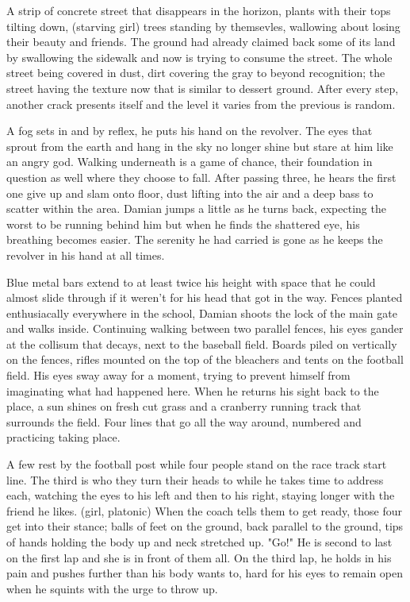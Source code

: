 \begin{Document}
       A strip of concrete street that disappears in the horizon, plants with their tops tilting down, (starving girl) trees standing by themsevles, wallowing
    about losing their beauty and friends. The ground had already claimed back some of its land by swallowing the sidewalk and now is trying to consume the street.
    The whole street being covered in dust, dirt covering the gray to beyond recognition; the street having the texture now that is similar to dessert ground. 
    After every step, another crack presents itself and the level it varies from the previous is random.

        A fog sets in and by reflex, he puts his hand on the revolver. The eyes that sprout from the earth and hang in the sky no longer shine but stare at him
    like an angry god. Walking underneath is a game of chance, their foundation in question as well where they choose to fall. After passing three, he hears
    the first one give up and slam onto floor, dust lifting into the air and a deep bass to scatter within the area. Damian jumps a little as he turns back,
    expecting the worst to be running behind him but when he finds the shattered eye, his breathing becomes easier. The serenity he had carried is gone as he
    keeps the revolver in his hand at all times.

       Blue metal bars extend to at least twice his height with space that he could almost slide through if it weren't for his head that got in the way. Fences
    planted enthusiacally everywhere in the school, Damian shoots the lock of the main gate and walks inside. Continuing walking between two parallel fences, his
    eyes gander at the collisum that decays, next to the baseball field. Boards piled on vertically on the fences, rifles mounted on the top of the bleachers
    and tents on the football field. His eyes sway away for a moment, trying to prevent himself from imaginating what had happened here. When he returns his sight
    back to the place, a sun shines on fresh cut grass and a cranberry running track that surrounds the field. Four lines that go all the way around, numbered and
    practicing taking place. 

        A few rest by the football post while four people stand on the race track start line. The third is who they turn their heads to while he takes time to 
    address each, watching the eyes to his left and then to his right, staying longer with the friend he likes. (girl, platonic) When the coach tells them to get
    ready, those four get into their stance; balls of feet on the ground, back parallel to the ground, tips of hands holding the body up and neck stretched up. 
    "Go!" He is second to last on the first lap and she is in front of them all. On the third lap, he holds in his pain and pushes further than his body wants
    to, hard for his eyes to remain open when he squints with the urge to throw up.


\end{Document}
